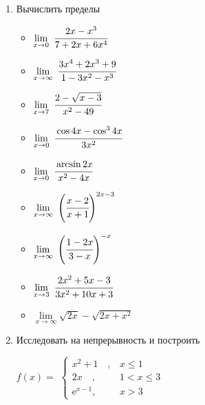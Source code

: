 \documentclass{article}
\begin{document}
\begin{multicols}{2}
\begin{enumerate}[label=\arabic*.]
	\item Вычислить пределы
	\begin{multicols}{3}
		\begin{itemize}[label="",leftmargin=0cm]
			\item $\lim\limits_{x \to 0}\ \cfrac{2x - x^3}{7+2x+6x^4}$
			\item $\lim\limits_{x \to \infty}\ \cfrac{3x^4 + 2x^3 + 9}{1-3x^2-x^3}$
			\item $\lim\limits_{x \to 7}\ \cfrac{2-\sqrt{x-3}}{x^2-49}$
				\vfill\null\columnbreak
			\item $\lim\limits_{x \to 0}\ \cfrac{\cos 4x - \cos^3 4x}{3x^2}$
			\item $\lim\limits_{x \to 0}\ \cfrac{\arcsin 2x}{x^2-4x}$
			\item $\lim\limits_{x \to \infty}\ \Bigg(\cfrac{x-2}{x+1}\Bigg)^{2x-3}$
				\vfill\null\columnbreak
			\item $\lim\limits_{x \to \infty}\ \Bigg(\cfrac{1-2x}{3-x}\Bigg)^{-x}$
			\item $\lim\limits_{x \to 3}\ \cfrac{2x^2+5x-3}{3x^2+10x+3}$
			\item $\lim\limits_{x \to \infty} \sqrt{2x}-\sqrt{2x+x^2}$
				\vfill\null\columnbreak
		\end{itemize}
	\end{multicols}
	\vspace{-5mm}
	\item Исследовать на непрерывность и построить
	\begin{multicols}{3}
		$f(x)=$
		$\begin{cases}
		x^2 + 1 \quad, & x \leq 1\\
		2x \quad, & 1 < x \leq 3 \\
		\mbox{e}^{x-1}, & x > 3
		\end{cases}$
		\vfill\null\columnbreak
		\vfill\null\columnbreak
	\end{multicols}
	

\end{enumerate}
\end{multicols}
\end{document}
